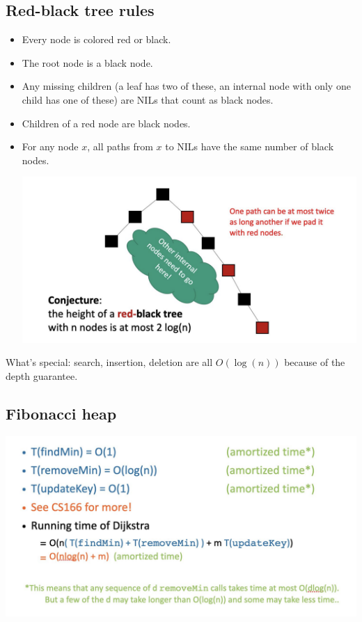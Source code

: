 \documentclass[12pt]{article}
\begin{document}
\subsection*{Red-black tree rules}
\begin{itemize}
    \item Every node is colored red or black.
    \item The root node is a black node.
    \item Any missing children (a leaf has two of these, an internal node with only one child has one of these) are NILs that count as black nodes.
    \item Children of a red node are black nodes.
    \item For any node $x$, all paths from $x$ to NILs have the same number of black nodes.
\begin{center}
\includegraphics[scale=0.5]{rbtbalance.png} 
\end{center}
\end{itemize}
What's special: search, insertion, deletion are all $O(\log(n))$ because of the depth guarantee. 
\subsection*{Fibonacci heap}
\begin{center}
\includegraphics[scale=0.5]{fibonacci.png} 
\end{center}
\end{document}
